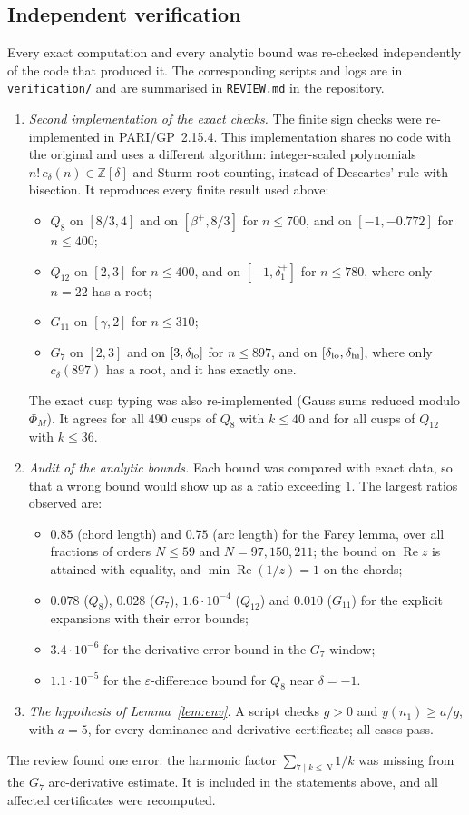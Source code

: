 \documentclass[11pt]{amsart}
\theoremstyle{remark}
\theoremstyle{definition}
\newcommand{\Z}{\mathbb Z}
\newcommand{\Rea}{\operatorname{Re}}
\begin{document}
\subsection*{Independent verification}
Every exact computation and every analytic bound was re-checked independently of the code that produced it. The corresponding scripts and logs are in \texttt{verification/} and are summarised in \texttt{REVIEW.md} in the repository.
\begin{enumerate}[leftmargin=2em]
\item \emph{Second implementation of the exact checks.} The finite sign checks were re-implemented in PARI/GP~2.15.4. This implementation shares no code with the original and uses a different algorithm: integer-scaled polynomials $n!\,c_\delta(n)\in\Z[\delta]$ and Sturm root counting, instead of Descartes' rule with bisection. It reproduces every finite result used above:
\begin{itemize}[leftmargin=1.5em]
\item $Q_8$ on $[8/3,4]$ and on $[\beta^+,8/3]$ for $n\le700$, and on $[-1,-0.772]$ for $n\le400$;
\item $Q_{12}$ on $[2,3]$ for $n\le400$, and on $[-1,\delta_1^+]$ for $n\le780$, where only $n=22$ has a root;
\item $G_{11}$ on $[\gamma,2]$ for $n\le310$;
\item $G_7$ on $[2,3]$ and on $[3,\delta_{\rm lo}]$ for $n\le897$, and on $[\delta_{\rm lo},\delta_{\rm hi}]$, where only $c_\delta(897)$ has a root, and it has exactly one.
\end{itemize}
The exact cusp typing was also re-implemented (Gauss sums reduced modulo $\Phi_M$). It agrees for all $490$ cusps of $Q_8$ with $k\le40$ and for all cusps of $Q_{12}$ with $k\le36$.
\item \emph{Audit of the analytic bounds.} Each bound was compared with exact data, so that a wrong bound would show up as a ratio exceeding $1$. The largest ratios observed are:
\begin{itemize}[leftmargin=1.5em]
\item $0.85$ (chord length) and $0.75$ (arc length) for the Farey lemma, over all fractions of orders $N\le59$ and $N=97,150,211$; the bound on $\Rea z$ is attained with equality, and $\min\Rea(1/z)=1$ on the chords;
\item $0.078$ ($Q_8$), $0.028$ ($G_7$), $1.6\cdot10^{-4}$ ($Q_{12}$) and $0.010$ ($G_{11}$) for the explicit expansions with their error bounds;
\item $3.4\cdot10^{-6}$ for the derivative error bound in the $G_7$ window;
\item $1.1\cdot10^{-5}$ for the $\varepsilon$-difference bound for $Q_8$ near $\delta=-1$.
\end{itemize}
\item \emph{The hypothesis of Lemma~\ref{lem:env}.} A script checks $g>0$ and $y(n_1)\ge a/g$, with $a=5$, for every dominance and derivative certificate; all cases pass.
\end{enumerate}
The review found one error: the harmonic factor $\sum_{7\mid k\le N}1/k$ was missing from the $G_7$ arc-derivative estimate. It is included in the statements above, and all affected certificates were recomputed.
\end{document}
